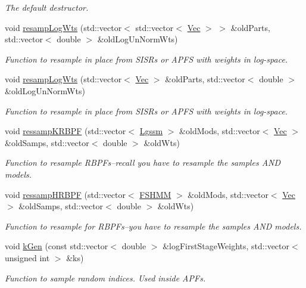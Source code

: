 \begin{DoxyCompactItemize}
\begin{DoxyCompactList}\small\item\em The default destructor. \end{DoxyCompactList}\item 
void \hyperlink{classMultinomResamp_a0ea6269180faf0b0613072d9bc8a7b53}{resamp\+Log\+Wts} (std\+::vector$<$ std\+::vector$<$ \hyperlink{apf__filter_8h_a4c7df05c6f5e8a0d15ae14bcdbc07152}{Vec} $>$ $>$ \&old\+Parts, std\+::vector$<$ double $>$ \&old\+Log\+Un\+Norm\+Wts)
\begin{DoxyCompactList}\small\item\em Function to resample in place from S\+I\+S\+Rs or A\+P\+FS with weights in log-\/space. \end{DoxyCompactList}\item 
void \hyperlink{classMultinomResamp_afd01aa78b0e2c0112c6af41164bc1e2b}{resamp\+Log\+Wts} (std\+::vector$<$ \hyperlink{apf__filter_8h_a4c7df05c6f5e8a0d15ae14bcdbc07152}{Vec} $>$ \&old\+Parts, std\+::vector$<$ double $>$ \&old\+Log\+Un\+Norm\+Wts)
\begin{DoxyCompactList}\small\item\em Function to resample in place from S\+I\+S\+Rs or A\+P\+FS with weights in log-\/space. \end{DoxyCompactList}\item 
void \hyperlink{classMultinomResamp_ad39c4f5d5460e3e4a2c56370c8dab39f}{ressamp\+K\+R\+B\+PF} (std\+::vector$<$ \hyperlink{classLgssm}{Lgssm} $>$ \&old\+Mods, std\+::vector$<$ \hyperlink{apf__filter_8h_a4c7df05c6f5e8a0d15ae14bcdbc07152}{Vec} $>$ \&old\+Samps, std\+::vector$<$ double $>$ \&old\+Wts)
\begin{DoxyCompactList}\small\item\em Function to resample R\+B\+P\+Fs--recall you have to resample the samples A\+ND models. \end{DoxyCompactList}\item 
void \hyperlink{classMultinomResamp_aaddcbec4eb62954d8d7aa96c45ffd7d0}{ressamp\+H\+R\+B\+PF} (std\+::vector$<$ \hyperlink{classFSHMM}{F\+S\+H\+MM} $>$ \&old\+Mods, std\+::vector$<$ \hyperlink{apf__filter_8h_a4c7df05c6f5e8a0d15ae14bcdbc07152}{Vec} $>$ \&old\+Samps, std\+::vector$<$ double $>$ \&old\+Wts)
\begin{DoxyCompactList}\small\item\em Function to resample for R\+B\+P\+Fs--you have to resample the samples A\+ND models. \end{DoxyCompactList}\item 
void \hyperlink{classMultinomResamp_a8112ff1114963723e24a1eed4a9f3efb}{k\+Gen} (const std\+::vector$<$ double $>$ \&log\+First\+Stage\+Weights, std\+::vector$<$ unsigned int $>$ \&ks)
\begin{DoxyCompactList}\small\item\em Function to sample random indices. Used inside A\+P\+Fs. \end{DoxyCompactList}\end{DoxyCompactItemize}



